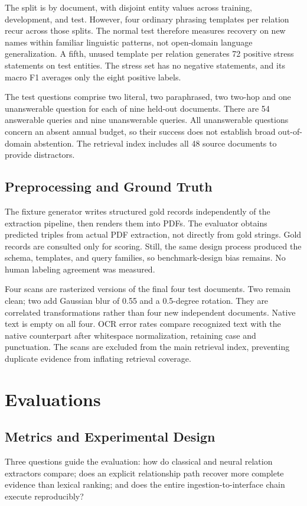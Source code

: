\documentclass[conference]{IEEEtran}
\begin{document}
The split is by document, with disjoint entity values across training, development, and test. However, four ordinary phrasing templates per relation recur across those splits. The normal test therefore measures recovery on new names within familiar linguistic patterns, not open-domain language generalization. A fifth, unused template per relation generates 72 positive stress statements on test entities. The stress set has no negative statements, and its macro F1 averages only the eight positive labels.

The test questions comprise two literal, two paraphrased, two two-hop and one unanswerable question for each of nine held-out documents. There are 54 answerable queries and nine unanswerable queries. All unanswerable questions concern an absent annual budget, so their success does not establish broad out-of-domain abstention. The retrieval index includes all 48 source documents to provide distractors.

\subsection{Preprocessing and Ground Truth}
The fixture generator writes structured gold records independently of the extraction pipeline, then renders them into PDFs. The evaluator obtains predicted triples from actual PDF extraction, not directly from gold strings. Gold records are consulted only for scoring. Still, the same design process produced the schema, templates, and query families, so benchmark-design bias remains. No human labeling agreement was measured.

Four scans are rasterized versions of the final four test documents. Two remain clean; two add Gaussian blur of 0.55 and a 0.5-degree rotation. They are correlated transformations rather than four new independent documents. Native text is empty on all four. OCR error rates compare recognized text with the native counterpart after whitespace normalization, retaining case and punctuation. The scans are excluded from the main retrieval index, preventing duplicate evidence from inflating retrieval coverage.

\section{Evaluations}
\label{sec:eval}
\subsection{Metrics and Experimental Design}
Three questions guide the evaluation: how do classical and neural relation extractors compare; does an explicit relationship path recover more complete evidence than lexical ranking; and does the entire ingestion-to-interface chain execute reproducibly?
\end{document}
